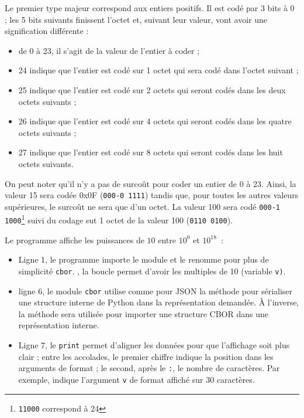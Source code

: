       \vspace{1em}

Le premier type majeur correspond aux entiers positifs. Il est codé par 3 bits à 0 ; les 5 bits suivants finissent l'octet et, suivant leur valeur, vont avoir une signification différente :
\begin{itemize}
    \item de 0 à 23, il s'agit de la valeur de l'entier à coder ;
    \item 24 indique que l'entier est codé sur 1 octet qui sera codé dans l'octet suivant ;
    \item 25 indique que l'entier est codé sur 2 octets qui seront codés dans les deux octets suivants ;
    \item 26 indique que l'entier est codé sur 4 octets qui seront codés dans les quatre octets suivants ;
    \item 27 indique que l'entier est codé sur 8 octets qui seront codés dans les huit octets suivants.
\end{itemize}

      \vspace{1em}

On peut noter qu'il n'y a pas de surcoût pour coder un entier de 0 à 23. Ainsi, la valeur 15 sera codée 0x0F (\texttt{000-0 1111}) tandis que, pour toutes les autres valeurs supérieures, le surcoût ne sera que d'un octet. La valeur 100 sera codé \texttt{000-1 1000}\footnote{\texttt{11000} correspond à 24} suivi du codage sut 1 octet de la valeur 100 (\texttt{0110 0100}).

      \vspace{1em}


Le programme   affiche les puissances de $10$ entre $10^0$ et $10^{18}$~:

\begin{itemize}
    \item Ligne 1, le programme importe le module \texttt{} et le renomme pour plus de simplicité \texttt{cbor}.
    , la boucle permet d'avoir les multiples de 10 (variable \texttt{v)}. 
    \item ligne 6, le module \texttt{cbor} utilise comme pour JSON la méthode  pour sérialiser une structure interne de Python dans la représentation demandée. À l'inverse, la méthode  sera utilisée pour importer une structure CBOR dans une représentation interne.
    \item Ligne 7, le \texttt{print} permet d'aligner les données pour que l'affichage soit plus clair ; entre les accolades, le premier chiffre indique la position dans les arguments de format ; le second, après le \texttt{:}, le nombre de caractères. Par exemple,  indique l'argument \texttt{v} de format affiché sur 30 caractères.
\end{itemize}
 

